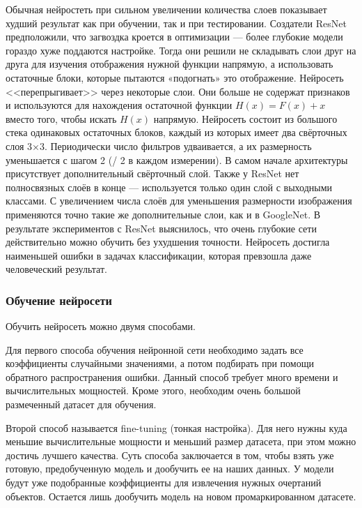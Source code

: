 \documentclass[a4paper,14pt]{article}
\begin{document}
Обычная нейростеть при сильном увеличении количества слоев показывает худший результат как при обучении, так и при тестировании.
Создатели ResNet предположили, что загвоздка кроется в оптимизации — более глубокие модели гораздо хуже поддаются настройке.
Тогда они решили не складывать слои друг на друга для изучения отображения нужной функции напрямую, а использовать остаточные блоки, которые пытаются «подогнать» это отображение.
Нейросеть <<перепрыгивает>> через некоторые слои.
Они больше не содержат признаков и используются для нахождения остаточной функции $H(x) = F(x) + x$ вместо того, чтобы искать $H(x)$ напрямую.
Нейросеть состоит из большого стека одинаковых остаточных блоков, каждый из которых имеет два свёрточных слоя 3×3.
Периодически число фильтров удваивается, а их размерность уменьшается с шагом 2 (/ 2 в каждом измерении).
В самом начале архитектуры присутствует дополнительный свёрточный слой.
Также у ResNet нет полносвязных слоёв в конце — используется только один слой с выходными классами.
С увеличением числа слоёв для уменьшения размерности изображения применяются точно такие же дополнительные слои, как и в GoogleNet. 
В результате экспериментов с ResNet выяснилось, что очень глубокие сети действительно можно обучить без ухудшения точности.
Нейросеть достигла наименьшей ошибки в задачах классификации, которая превзошла даже человеческий результат.


\subsubsection{Обучение нейросети}

Обучить нейросеть можно двумя способами.

Для первого способа обучения нейронной сети необходимо задать все коэффициенты случайными значениями, а потом подбирать при помощи обратного распространения ошибки.
Данный способ требует много времени и вычислительных мощностей.
Кроме этого, необходим очень большой размеченный датасет для обучения.

Второй способ называется fine-tuning (тонкая настройка).
Для него нужны куда меньшие вычислительные мощности и меньший размер датасета, при этом можно достичь лучшего качества.
Суть способа заключается в том, чтобы взять уже готовую, предобученную модель и дообучить ее на наших данных.
У модели будут уже подобранные коэффициенты для извлечения нужных очертаний объектов.
Остается лишь дообучить модель на новом промаркированном датасете.
\end{document}
